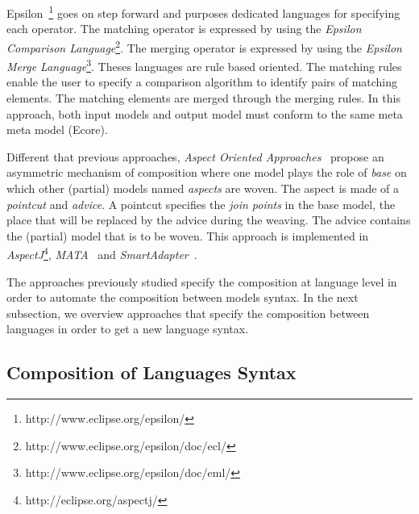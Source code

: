 Epsilon~\cite{epsilon}\footnote{http://www.eclipse.org/epsilon/} goes on step forward and purposes dedicated languages for specifying each operator. The matching operator is expressed by using the \emph{Epsilon Comparison Language}\footnote{http://www.eclipse.org/epsilon/doc/ecl/}. The merging operator is expressed by using the \emph{Epsilon Merge Language}\footnote{http://www.eclipse.org/epsilon/doc/eml/}. Theses languages are rule based oriented. The matching rules enable the user to specify a comparison algorithm to identify pairs of matching elements. The matching elements are merged through the merging rules. In this approach, both input models and output model must conform to the same meta meta model (Ecore).
    		
Different that previous approaches, \emph{Aspect Oriented Approaches}~\cite{aop} propose an asymmetric mechanism of composition where one model plays the role of \emph{base} on which other (partial) models named \emph{aspects} are woven. The aspect is made of a \emph{pointcut} and \emph{advice}. A pointcut specifies the \emph{join points} in the base model, \ie the place that will be replaced by the advice during the weaving. The advice contains the (partial) model that is to be woven. This approach is implemented in \emph{AspectJ}\footnote{http://eclipse.org/aspectj/}, \emph{MATA}~\cite{matabib} and \emph{SmartAdapter}~\cite{smartadapbib}. %

The approaches previously studied specify the composition at language level in order to automate the composition between models syntax. In the next subsection, we overview approaches that specify the composition between languages in order to get a new language syntax. 	 		
    	
\subsection{Composition of Languages Syntax}

